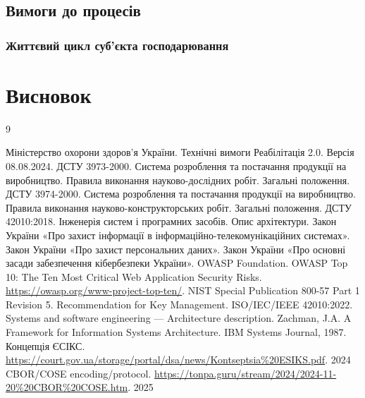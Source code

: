 \documentclass{article}
\begin{document}
\subsection{Вимоги до процесів}

\subsubsection{Життєвий цикл суб'єкта господарювання}

\newpage
\section*{Висновок}

\begin{thebibliography}{9}

 Міністерство охорони здоров’я України. \newblock Технічні вимоги Реабілітація 2.0. \newblock Версія 08.08.2024.
 ДСТУ 3973-2000. \newblock Система розроблення та постачання продукції на виробництво. Правила виконання науково-дослідних робіт. Загальні положення.
 ДСТУ 3974-2000. \newblock Система розроблення та постачання продукції на виробництво. Правила виконання науково-конструкторських робіт. Загальні положення.
 ДСТУ 42010:2018. \newblock Інженерія систем і програмних засобів. Опис архітектури.
 Закон України «Про захист інформації в інформаційно-телекомунікаційних системах».
 Закон України «Про захист персональних даних».
 Закон України «Про основні засади забезпечення кібербезпеки України».
 OWASP Foundation. \newblock OWASP Top 10: The Ten Most Critical Web Application Security Risks. \newblock \url{https://owasp.org/www-project-top-ten/}.
 NIST Special Publication 800-57 Part 1 Revision 5. \newblock Recommendation for Key Management.
 ISO/IEC/IEEE 42010:2022. \newblock Systems and software engineering — Architecture description.
 Zachman, J.A. \newblock A Framework for Information Systems Architecture. \newblock IBM Systems Journal, 1987.
 Концепція ЄСІКС. \url{https://court.gov.ua/storage/portal/dsa/news/Kontseptsia%20ESIKS.pdf}. 2024
 CBOR/COSE encoding/protocol. \url{https://tonpa.guru/stream/2024/2024-11-20%20CBOR%20COSE.htm}. 2025

\end{thebibliography}
\end{document}
